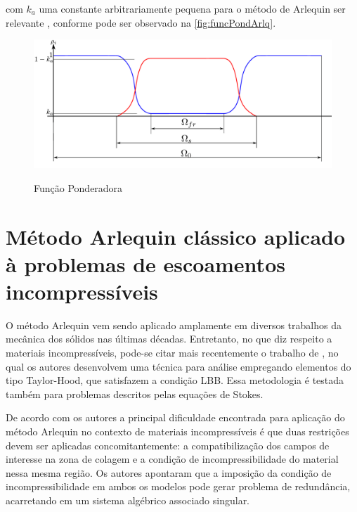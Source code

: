 \noindent com $k_a$ uma constante arbitrariamente pequena para o método de Arlequin ser relevante \cite{Dhia:2008}, conforme pode ser observado na \autoref{fig:funcPondArlq}.

\begin{figure}[!htbp]
	\caption{Função Ponderadora}
	\centering 
	\includegraphics[scale=0.6,trim=0cm 0cm 0cm 0.0cm, clip=true]{Imagens/Cap6/funcPondArlq.pdf}	
	\label{fig:funcPondArlq}
\end{figure}

\section{Método Arlequin clássico aplicado à problemas de escoamentos incompressíveis}

O método Arlequin vem sendo aplicado amplamente em diversos trabalhos da mecânica dos sólidos nas últimas décadas. Entretanto, no que diz respeito a materiais incompressíveis, pode-se citar mais recentemente o trabalho de , no qual os autores desenvolvem uma técnica para análise empregando elementos do tipo Taylor-Hood, que satisfazem a condição LBB. Essa metodologia é testada também para problemas descritos pelas equações de Stokes.

De acordo com os autores  a principal dificuldade encontrada para aplicação do método Arlequin no contexto de materiais incompressíveis é que duas restrições devem ser aplicadas concomitantemente: a compatibilização dos campos de interesse na zona de colagem e a condição de incompressibilidade do material nessa mesma região. Os autores apontaram que a imposição da condição de incompressibilidade em ambos os modelos pode gerar problema de redundância, acarretando em um sistema algébrico associado singular.

